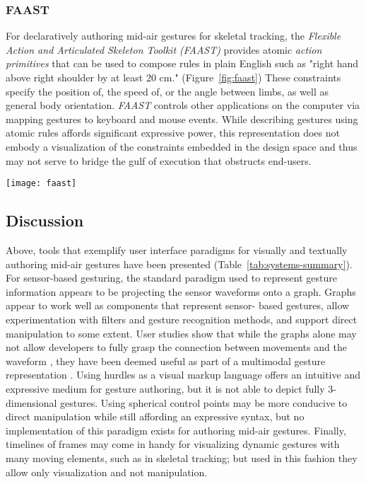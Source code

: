 \subsubsection{FAAST}

For declaratively authoring mid-air gestures for skeletal tracking, the \emph{Flexible Action and Articulated Skeleton Toolkit (FAAST)} \parencite{Suma:2013} provides atomic \emph{action primitives} that can be used to compose rules in plain English such as "right hand above right shoulder by at least 20 cm." (Figure~\ref{fig:faast}) These constraints specify the position of, the speed of, or the angle between limbs, as well as general body orientation. \emph{FAAST} controls other applications on the computer via mapping gestures to keyboard and mouse events. While describing gestures using atomic rules affords significant expressive power, this representation does not embody a visualization of the constraints embedded in the design space and thus may not serve to bridge the gulf of execution that obstructs end-users.

\begin{SCfigure}[\sidecaptionrelwidth][ht]
\centering
\texttt{[image: faast]}
\caption{FAAST \parencite{Suma:2013} provides atomic primitives that can be used to compose rules in plain English that map to mid-air gestures.}
\label{fig:faast}
\end{SCfigure}

\subsection{Discussion}

Above, tools that exemplify user interface paradigms for visually and textually authoring mid-air gestures have been presented (Table~\ref{tab:systems-summary}). For sensor-based gesturing, the standard paradigm used to represent gesture information appears to be projecting the sensor waveforms onto a graph. Graphs appear to work well as components that represent sensor- based gestures, allow experimentation with filters and gesture recognition methods, and support direct manipulation to some extent. User studies show that while the graphs alone may not allow developers to fully grasp the connection between movements and the waveform \parencite{Ashbrook:2010}, they have been deemed useful as part of a multimodal gesture representation \parencite{Zamborlin:2014}. Using hurdles as a visual markup language offers an intuitive and expressive medium for gesture authoring, but it is not able to depict fully 3-dimensional gestures. Using spherical control points may be more conducive to direct manipulation while still affording an expressive syntax, but no implementation of this paradigm exists for authoring mid-air gestures. Finally, timelines of frames may come in handy for visualizing dynamic gestures with many moving elements, such as in skeletal tracking; but used in this fashion they allow only visualization and not manipulation.

